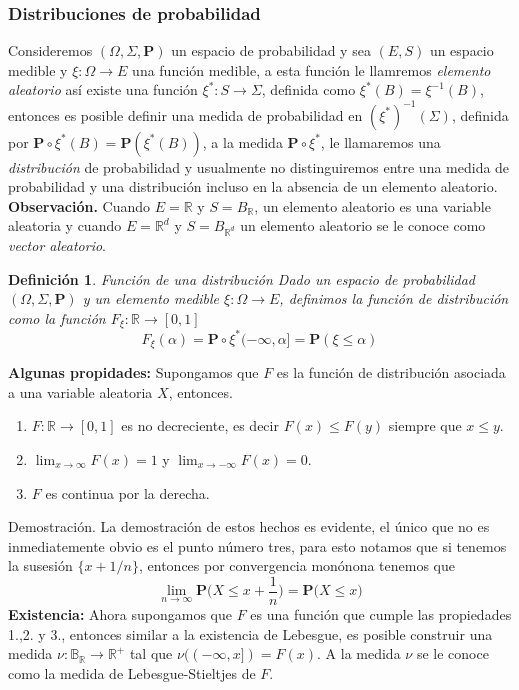 \documentclass[letterpaper]{article}
\newtheorem{def.}{Definici\'on}[section]
\newcommand{\prob}{\textbf{P}}
\newcommand{\obs}{{\newline \noindent \sc \textbf{Observación. }}}
\newcommand{\dem}{{\noindent \sc Demostraci\'on. }}
\newcommand{\om}{\ensuremath{\Omega}}
\newcommand{\sig}{\ensuremath{\Sigma}}
\newcommand{\re}{\ensuremath{\mathbb R }}
\begin{document}
\subsubsection{Distribuciones de probabilidad}
\label{sec:org3d9d042}
\noindent Consideremos \((\om,\sig,\prob)\) un espacio de probabilidad y sea \((E,S)\) un espacio medible y \(\xi:\om\rightarrow E\) una función medible, a esta función le llamremos \emph{elemento aleatorio} así existe una función \(\xi^{*}:S\rightarrow\sig\), definida como \(\xi^{*}(B)=\xi^{-1}(B)\), entonces es posible definir una medida de probabilidad en \((\xi^{*})^{-1}(\sig)\), definida por \(\prob\circ\xi^{*}(B)=\prob(\xi^{*}(B))\), a la medida \(\prob\circ\xi^{*}\), le llamaremos una \emph{distribución} de probabilidad y usualmente no distinguiremos entre una medida de probabilidad y una distribución incluso en la absencia de un elemento aleatorio.
\obs Cuando \(E=\re\) y \(S=B_{\re}\), un elemento aleatorio es una variable aleatoria y cuando \(E=\re^{d}\) y \(S=B_{\re^{d}}\) un elemento aleatorio se le conoce como \emph{vector aleatorio}.
\begin{def.}{Función de una distribución}
Dado un espacio de probabilidad \((\om,\sig,\prob)\) y un elemento medible \(\xi:\om\rightarrow E\), definimos la \textit{función} de distribución como la función \(F_{\xi}:\re\rightarrow[0,1]\)
\[
    F_{\xi}(\alpha)=\prob\circ\xi^{*}(-\infty,\alpha]=\prob(\xi\leq\alpha)
\]
\end{def.}
\noindent \textbf{Algunas propidades:} Supongamos que \(F\) es la función de distribución asociada a una variable aleatoria \(X\), entonces.
\begin{enumerate}
\item \(F:\re\rightarrow[0,1]\) es no decreciente, es decir \(F(x)\leq F(y)\) siempre que \(x\leq y\).
\item \(\lim_{x\rightarrow\infty}F(x)=1\) y \(\lim_{x\rightarrow -\infty}F(x)=0\).
\item \(F\) es continua por la derecha.
\end{enumerate}
\dem La demostración de estos hechos es evidente, el único que no es inmediatemente obvio es el punto número tres, para esto notamos que si tenemos la susesión \(\{x+1/n\}\), entonces por convergencia monónona tenemos que
\[
    \lim_{n\rightarrow\infty}\prob\Big(X\leq x+\frac{1}{n}\Big)=\prob\Big(X\leq x\Big)
\]
\noindent \textbf{Existencia:} Ahora supongamos que \(F\) es una función que cumple las propiedades 1.,2. y 3., entonces similar a la existencia de Lebesgue, es posible construir una medida \(\nu:\mathbb{B}_{\re}\rightarrow\re^{+}\) tal que \(\nu((-\infty,x])=F(x)\). A la medida \(\nu\) se le conoce como la medida de Lebesgue-Stieltjes de \(F\).
\end{document}
